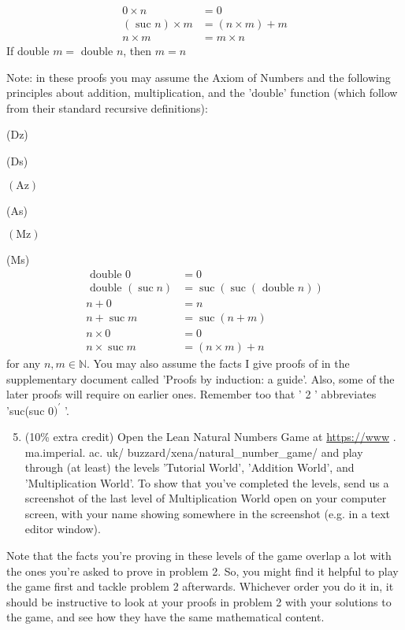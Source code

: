 \documentclass[10pt]{article}
\begin{document}
$$
\begin{aligned}
0 \times n &=0 \\
(\text { suc } n) \times m &=(n \times m)+m \\
n \times m &=m \times n
\end{aligned}
$$
If double $m=$ double $n$, then $m=n$

Note: in these proofs you may assume the Axiom of Numbers and the following principles about addition, multiplication, and the 'double' function (which follow from their standard recursive definitions):

(Dz)

(Ds)

$(\mathrm{Az})$

(As)

$(\mathrm{Mz})$

(Ms)
$$
\begin{aligned}
\text { double } 0 &=0 \\
\text { double }(\operatorname{suc} n) &=\operatorname{suc}(\operatorname{suc}(\text { double } n)) \\
n+0 &=n \\
n+\operatorname{suc} m &=\operatorname{suc}(n+m) \\
n \times 0 &=0 \\
n \times \operatorname{suc} m &=(n \times m)+n
\end{aligned}
$$
for any $n, m \in \mathbb{N}$. You may also assume the facts I give proofs of in the supplementary document called 'Proofs by induction: a guide'. Also, some of the later proofs will require on earlier ones. Remember too that ' 2 ' abbreviates 'suc(suc 0$)^{\prime}$ '.

\begin{enumerate}
  \setcounter{enumi}{4}
  \item (10\% extra credit) Open the Lean Natural Numbers Game at \href{https://www}{https://www} . ma.imperial. ac. uk/ buzzard/xena/natural\_number\_game/ and play through (at least) the levels 'Tutorial World', 'Addition World', and 'Multiplication World'. To show that you've completed the levels, send us a screenshot of the last level of Multiplication World open on your computer screen, with your name showing somewhere in the screenshot (e.g. in a text editor window).
\end{enumerate}
Note that the facts you're proving in these levels of the game overlap a lot with the ones you're asked to prove in problem 2. So, you might find it helpful to play the game first and tackle problem 2 afterwards. Whichever order you do it in, it should be instructive to look at your proofs in problem 2 with your solutions to the game, and see how they have the same mathematical content.
\end{document}
